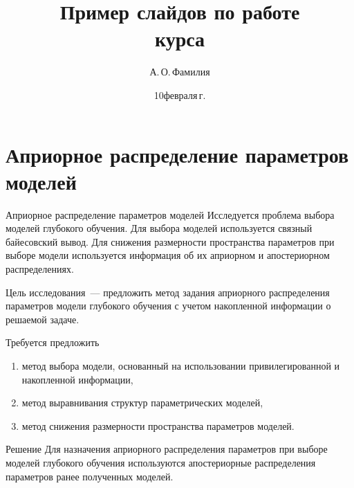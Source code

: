 \documentclass[10pt,pdf,hyperref={unicode}]{beamer}
\title[Пример слайдов по работе]{Пример слайдов по работе \\ курса}
\author{А.\,О.\,Фамилия}
\institute[]{Московский физико-технический институт}
\date[2022]{\small 10\;февраля\;2022\,г.}
\begin{document}
\begin{frame}
\titlepage
\end{frame}

\section{Априорное распределение параметров моделей}
\begin{frame}{Априорное распределение параметров моделей}
\bigskip
Исследуется проблема выбора моделей глубокого обучения. Для выбора моделей используется связный байесовский вывод. Для снижения размерности пространства параметров при выборе модели используется информация об их априорном и апостериорном распределениях. 
\begin{block}{Цель исследования~---}
предложить метод задания априорного распределения параметров модели глубокого обучения с учетом накопленной информации о решаемой задаче.
\end{block}
\begin{block}{Требуется предложить}
\justifying
\begin{enumerate}[1)]
\item метод выбора модели, основанный на использовании привилегированной и накопленной информации,
\item метод выравнивания структур параметрических моделей,
\item метод снижения размерности пространства параметров моделей.
\end{enumerate}
\end{block}
\begin{block}{Решение}
Для назначения априорного распределения параметров при выборе моделей глубокого обучения используются апостериорные распределения параметров ранее полученных моделей.
\end{block}
\end{frame}
\end{document}
